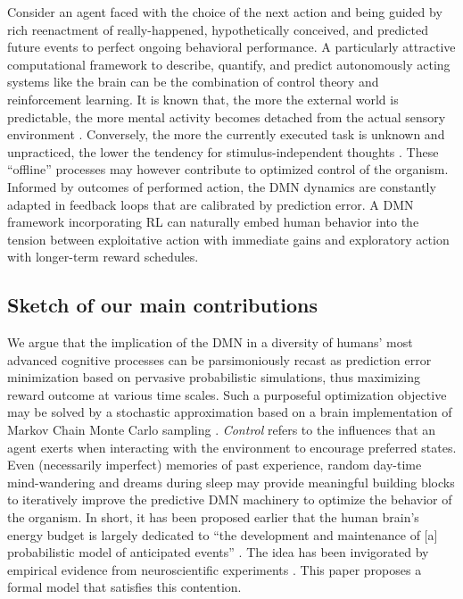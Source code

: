 \documentclass[10pt,letterpaper]{article}
\begin{document}
Consider an agent faced with the choice of the next action
and being guided by rich
reenactment of really-happened, hypothetically conceived, and
predicted future events to perfect ongoing behavioral performance.
A particularly attractive computational framework
to describe, quantify, and predict autonomously acting systems like the brain
can be the combination of control theory and reinforcement learning.
It is known that, the more the external world is predictable,
the more mental activity becomes detached from the actual sensory environment
\citep{antrobus1966studies, pope1978regulation}.
Conversely,
the more the currently executed task is unknown and unpracticed,
the lower the tendency for stimulus-independent thoughts
\citep{filler1973daydreaming, teasdale1995stimulus}.
These ``offline'' processes may however contribute to optimized control of the organism.
Informed by outcomes of performed action,
the DMN dynamics are constantly adapted in feedback loops
that are calibrated by prediction error.
A DMN framework incorporating RL can naturally embed human behavior
into the tension between exploitative action with immediate gains and
exploratory action with longer-term reward schedules.


\subsection{Sketch of our main contributions}
We argue that the implication of the DMN in a
diversity of humans' most advanced cognitive processes
can be parsimoniously recast as prediction error minimization
based on pervasive probabilistic simulations,
thus maximizing reward outcome at various time scales.
Such a purposeful optimization objective
may be solved by a stochastic approximation
based on a brain implementation of Markov Chain Monte Carlo sampling
\citep{tenenbaum2011grow}.
\textit{Control} refers to the influences that an agent exerts when interacting
with the environment to encourage preferred states.
Even (necessarily imperfect) memories
of past experience, random day-time mind-wandering and dreams during sleep
may provide meaningful building blocks to iteratively improve
the predictive DMN machinery to optimize the behavior of the organism.
%
In short, it has been proposed earlier that
the human brain's energy budget is largely dedicated to
``the development and maintenance of [a]
probabilistic model of anticipated events''
\citep{raichle2005intrinsic}.
The idea has been invigorated by empirical evidence from
neuroscientific experiments \citep{kording2004bayesian, fiser2004small}.
This paper proposes a formal model that satisfies this contention.
\end{document}
